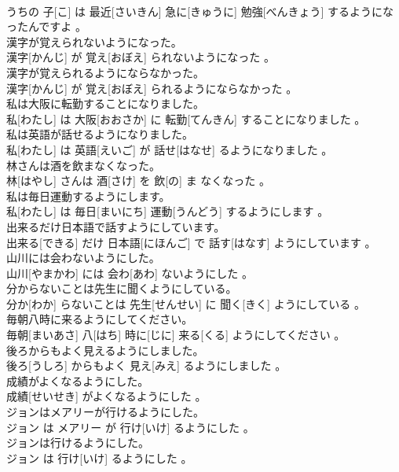 \documentclass[8pt]{extreport}
\begin{document}
\begin{CJK}{UTF8}{min}
\\	うちの 子[こ] は 最近[さいきん] 急に[きゅうに] 勉強[べんきょう] するようになったんですよ 。
\\	漢字が覚えられないようになった。	
\\	漢字[かんじ] が 覚え[おぼえ] られないようになった 。
\\	漢字が覚えられるようにならなかった。	
\\	漢字[かんじ] が 覚え[おぼえ] られるようにならなかった 。
\\	私は大阪に転勤することになりました。	
\\	私[わたし] は 大阪[おおさか] に 転勤[てんきん] することになりました 。
\\	私は英語が話せるようになりました。	
\\	私[わたし] は 英語[えいご] が 話せ[はなせ] るようになりました 。
\\	林さんは酒を飲まなくなった。	
\\	林[はやし] さんは 酒[さけ] を 飲[の] ま なくなった 。
\\	私は毎日運動するようにします。	
\\	私[わたし] は 毎日[まいにち] 運動[うんどう] するようにします 。
\\	出来るだけ日本語で話すようにしています。	
\\	出来る[できる] だけ 日本語[にほんご] で 話す[はなす] ようにしています 。
\\	山川には会わないようにした。	
\\	山川[やまかわ] には 会わ[あわ] ないようにした 。
\\	分からないことは先生に聞くようにしている。	
\\	分か[わか] らないことは 先生[せんせい] に 聞く[きく] ようにしている 。
\\	毎朝八時に来るようにしてください。	
\\	毎朝[まいあさ] 八[はち] 時に[じに] 来る[くる] ようにしてください 。
\\	後ろからもよく見えるようにしました。	
\\	後ろ[うしろ] からもよく 見え[みえ] るようにしました 。
\\	成績がよくなるようにした。	
\\	成績[せいせき] がよくなるようにした 。
\\	ジョンはメアリーが行けるようにした。	
\\	ジョン は メアリー が 行け[いけ] るようにした 。
\\	ジョンは行けるようにした。	
\\	ジョン は 行け[いけ] るようにした 。

\end{CJK}
\end{document}
